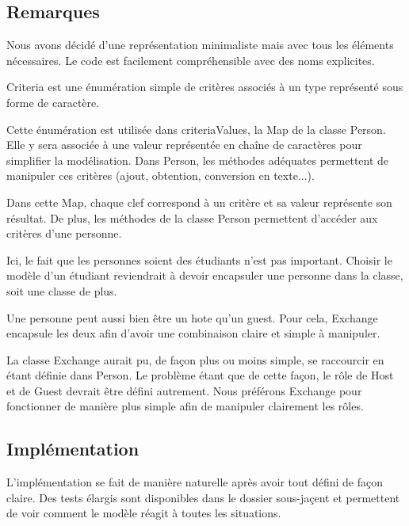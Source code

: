 \documentclass{mytex}
\begin{document}
\subsection{Remarques}

Nous avons décidé d'une représentation minimaliste mais avec tous les éléments nécessaires.
Le code est facilement compréhensible avec des noms explicites.


Criteria est une énumération simple de critères associés à un type représenté sous forme de caractère.

Cette énumération est utilisée dans criteriaValues, la Map de la classe Person. Elle y sera associée à une valeur représentée en chaîne de caractères pour simplifier la modélisation. Dans Person, les méthodes adéquates permettent de manipuler ces critères (ajout, obtention, conversion en texte...).

Dans cette Map, chaque clef correspond à un critère et sa valeur représente son résultat. De plus, les méthodes de la classe Person permettent d'accéder aux critères d'une personne.


Ici, le fait que les personnes soient des étudiants n'est pas important.
Choisir le modèle d'un étudiant reviendrait à devoir encapsuler une personne dans la classe, soit une classe de plus.


Une personne peut aussi bien être un hote qu'un guest.
Pour cela, Exchange encapsule les deux afin d'avoir une combinaison claire et simple à manipuler.


La classe Exchange aurait pu, de façon plus ou moins simple, se raccourcir en étant définie dans Person.
Le problème étant que de cette façon, le rôle de Host et de Guest devrait être défini autrement. Nous préférons Exchange pour fonctionner de manière plus simple afin de manipuler clairement les rôles.

\subsection{Implémentation}

L'implémentation se fait de manière naturelle après avoir tout défini de façon claire.
Des tests élargis sont disponibles dans le dossier sous-jaçent et permettent de voir comment le modèle réagit à toutes les situations.
\end{document}
